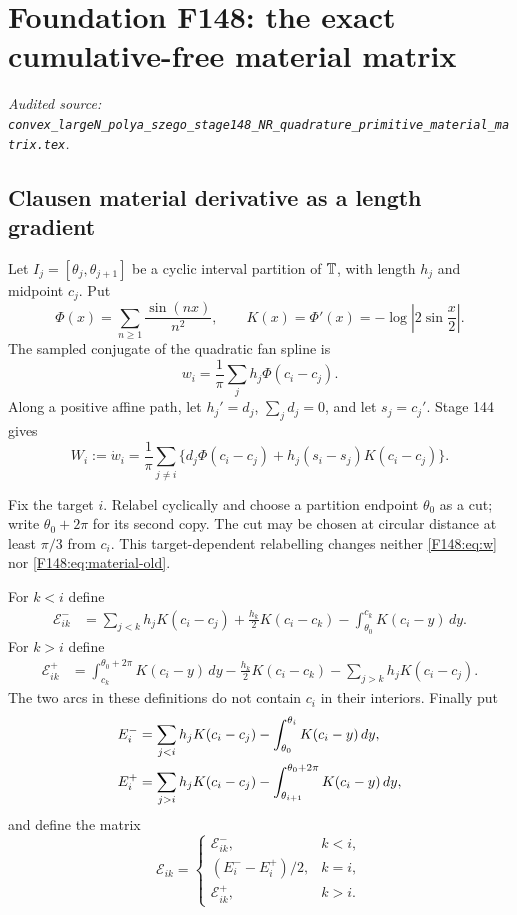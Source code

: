 \begingroup
\section{Foundation F148: the exact cumulative-free material matrix}
\label{module:F148}
\noindent\textit{Audited source: \nolinkurl{convex_largeN_polya_szego_stage148_NR_quadrature_primitive_material_matrix.tex}.}
\subsection{Clausen material derivative as a length gradient}

Let $I_j=[\theta_j,\theta_{j+1}]$ be a cyclic interval partition of
$\mathbb T$, with length $h_j$ and midpoint $c_j$.  Put
\begin{equation}\label{F148:eq:clausen}
 \Phi(x)=\sum_{n\ge1}\frac{\sin(nx)}{n^2},\qquad
 K(x)=\Phi'(x)=-\log\left|2\sin\frac x2\right|.
\end{equation}
The sampled conjugate of the quadratic fan spline is
\begin{equation}\label{F148:eq:w}
 w_i=\frac1\pi\sum_jh_j\Phi(c_i-c_j).
\end{equation}
Along a positive affine path, let $h_j'=d_j$, $\sum_jd_j=0$, and let
$s_j=c_j'$.  Stage 144 gives
\begin{equation}\label{F148:eq:material-old}
 W_i:=\dot w_i=\frac1\pi\sum_{j\ne i}
 \{d_j\Phi(c_i-c_j)+h_j(s_i-s_j)K(c_i-c_j)\}.
\end{equation}

Fix the target $i$.  Relabel cyclically and choose a partition endpoint
$\theta_0$ as a cut; write $\theta_0+2\pi$ for its second copy.  The cut
may be chosen at circular distance at least $\pi/3$ from $c_i$.  This
target-dependent relabelling changes neither \eqref{F148:eq:w} nor
\eqref{F148:eq:material-old}.

For $k<i$ define
\begin{align}
 \mathscr E_{ik}^-&=
 \sum_{j<k}h_jK(c_i-c_j)+\frac{h_k}{2}K(c_i-c_k)
 -\int_{\theta_0}^{c_k}K(c_i-y)\,dy. \label{F148:eq:Eminus}
\end{align}
For $k>i$ define
\begin{align}
 \mathscr E_{ik}^+&=
 \int_{c_k}^{\theta_0+2\pi}K(c_i-y)\,dy
 -\frac{h_k}{2}K(c_i-c_k)-\sum_{j>k}h_jK(c_i-c_j).
 \label{F148:eq:Eplus}
\end{align}
The two arcs in these definitions do not contain $c_i$ in their
interiors.  Finally put
\begin{align}
 E_i^-&=\sum_{j<i}h_jK(c_i-c_j)
       -\int_{\theta_0}^{\theta_i}K(c_i-y)\,dy,\notag\\
 E_i^+&=\sum_{j>i}h_jK(c_i-c_j)
       -\int_{\theta_{i+1}}^{\theta_0+2\pi}K(c_i-y)\,dy,
 \label{F148:eq:E-self}
\end{align}
and define the matrix
\begin{equation}\label{F148:eq:matrix}
 \mathscr E_{ik}=\begin{cases}
 \mathscr E_{ik}^-,&k<i,\\
 (E_i^--E_i^+)/2,&k=i,\\
 \mathscr E_{ik}^+,&k>i.
 \end{cases}
\end{equation}

